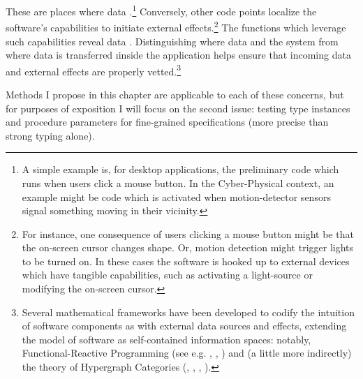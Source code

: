 {\begin{enumerate}
These are places where data 
.\footnote{A simple example is, for desktop applications, 
the preliminary code which runs when users click a mouse button.  
In the Cyber-Physical context, an example might be code which
is activated when motion-detector sensors signal something moving 
in their vicinity.
}  Conversely, other code points localize 
the software's capabilities to initiate external effects.\footnote{For 
instance, one consequence of users clicking a mouse button might 
be that the on-screen cursor changes shape.  Or, motion detection 
might trigger lights to be turned on.  In these cases the software 
is hooked up to external devices which have tangible capabilities, 
such as activating a light-source or modifying the on-screen cursor.
}  The functions which leverage such capabilities 
reveal data .  
Distinguishing where data 
 and  the system from where data is transferred 
\i{inside} the application helps ensure that 
incoming data and external effects are properly vetted.\footnote{Several mathematical frameworks have been developed 
to codify the intuition of software components as 
 with external data sources and effects, 
extending the model of software as self-contained 
information spaces: notably, Functional-Reactive Programming 
(see e.g. \cite{WolfgangJeltsch}, \cite{JenniferPaykin},
\cite{PaykinKrishnaswami}) and (a little more indirectly)
the theory of Hypergraph Categories
(\cite{InteractingConceptualSpaces}, \cite{BrendanFong}, 
\cite{BrendanFongThesis}, \cite{AleksKissinger}). 
}
\end{enumerate}
Methods I propose in this chapter are applicable to each 
of these concerns, but for purposes of exposition I 
will focus on the second issue: testing 
type instances and procedure parameters for fine-grained 
specifications (more precise than strong typing alone). 
}
